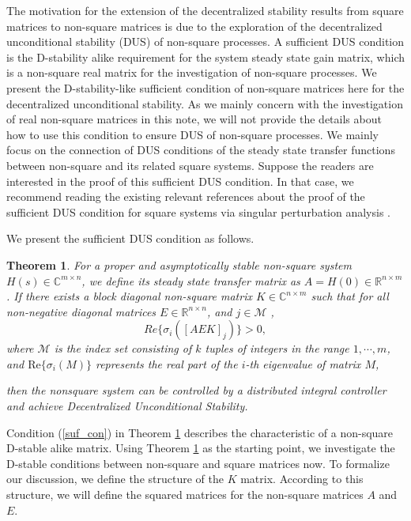 \documentclass{article}
\newtheorem{theorem}{Theorem}
\begin{document}
The motivation for the extension of the decentralized stability results from square matrices to non-square matrices is due to the exploration of the decentralized unconditional stability (DUS)\cite{Sko:-ariab} \cite{grosdidier1986interaction} \cite{Su:-Analy} of non-square processes. A sufficient DUS condition is the D-stability alike requirement for the system steady state gain matrix, which is a non-square real matrix for the investigation of non-square processes. We present the D-stability-like sufficient condition of non-square matrices here for the decentralized unconditional stability. As we mainly concern with the investigation of real non-square matrices in this note, we will not provide the details about how to use this condition to ensure DUS of non-square processes. We mainly focus on the connection of DUS conditions of the steady state transfer functions between non-square and its related square systems. Suppose the readers are interested in the proof of this sufficient DUS condition. In that case, we recommend reading the existing relevant references \cite{Sko:-ariab} \cite{grosdidier1986interaction} \cite{Su:-Analy} about the proof of the sufficient DUS condition for square systems via singular perturbation analysis \cite{Kokotovic:-Sing}. 

We present the sufficient DUS condition as follows.

\begin{theorem} \label{theorem1}
For a proper and asymptotically stable non-square system $H(s) \in \mathbb{C}^{m \times n}$, we define its steady state transfer matrix as $A=H(0) \in \mathbb{R}^{n \times m}$. If there exists a 
 block diagonal non-square matrix $K \in \mathbb{C}^{n \times m}$ such that for all non-negative diagonal matrices $E \in  \mathbb{R}^{n \times n}$, and $j \in \mathcal{M}$ \cite{campo1994achievable},
\begin{equation}\label{suf_con}
Re\{ \sigma_i ( [A E K]_j ) \} >0,
\end{equation}
where $\mathcal{M}$ is the index set consisting of $k$ tuples of integers in the range $1,\cdots, m$, and $\text{Re} \{ \sigma_i (M) \}$ represents the real part of the $i$-th eigenvalue of matrix $M$, 

then the nonsquare system can be controlled by a distributed integral controller and achieve Decentralized Unconditional Stability.
\end{theorem}

Condition (\ref{suf_con}) in Theorem \ref{theorem1} describes the characteristic of a non-square D-stable alike matrix. Using Theorem \ref{theorem1} as the starting point, we investigate the D-stable conditions between non-square and square matrices now. To formalize our discussion, we define the structure of the $K$ matrix. According to this structure, we will define the squared matrices for the non-square matrices $A$ and $E$.    
\end{document}
